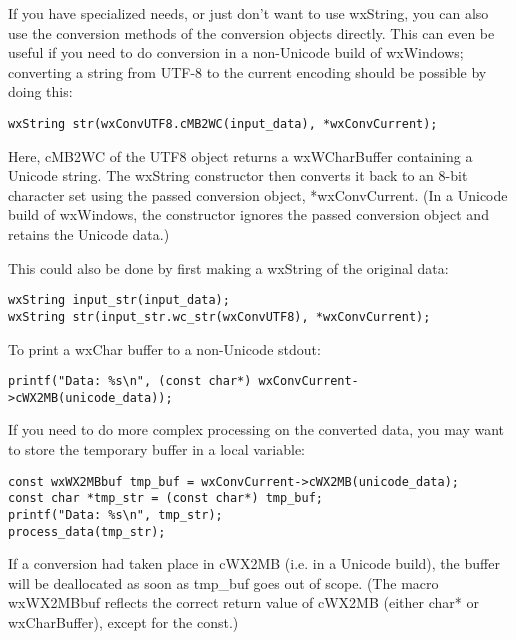 If you have specialized needs, or just don't want to use wxString, you
can also use the conversion methods of the conversion objects directly.
This can even be useful if you need to do conversion in a non-Unicode
build of wxWindows; converting a string from UTF-8 to the current
encoding should be possible by doing this:

\begin{verbatim}
wxString str(wxConvUTF8.cMB2WC(input_data), *wxConvCurrent);
\end{verbatim}

Here, cMB2WC of the UTF8 object returns a wxWCharBuffer containing a Unicode
string. The wxString constructor then converts it back to an 8-bit character
set using the passed conversion object, *wxConvCurrent. (In a Unicode build
of wxWindows, the constructor ignores the passed conversion object and
retains the Unicode data.)

This could also be done by first making a wxString of the original data:

\begin{verbatim}
wxString input_str(input_data);
wxString str(input_str.wc_str(wxConvUTF8), *wxConvCurrent);
\end{verbatim}

To print a wxChar buffer to a non-Unicode stdout:

\begin{verbatim}
printf("Data: %s\n", (const char*) wxConvCurrent->cWX2MB(unicode_data));
\end{verbatim}

If you need to do more complex processing on the converted data, you
may want to store the temporary buffer in a local variable:

\begin{verbatim}
const wxWX2MBbuf tmp_buf = wxConvCurrent->cWX2MB(unicode_data);
const char *tmp_str = (const char*) tmp_buf;
printf("Data: %s\n", tmp_str);
process_data(tmp_str);
\end{verbatim}

If a conversion had taken place in cWX2MB (i.e. in a Unicode build),
the buffer will be deallocated as soon as tmp_buf goes out of scope.
(The macro wxWX2MBbuf reflects the correct return value of cWX2MB
(either char* or wxCharBuffer), except for the const.)
